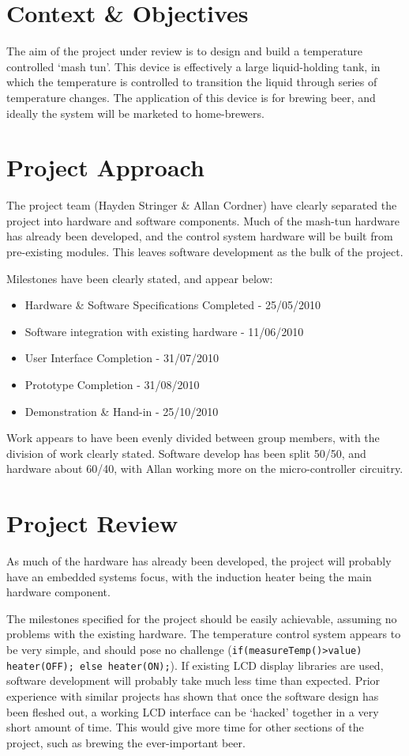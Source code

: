\documentclass[a4paper,12pt]{article}
\begin{document}
\newpage

\section{Context \& Objectives}
The aim of the project under review is to design and build a temperature controlled `mash tun'. This device is effectively a large liquid-holding tank, in which the temperature is controlled to transition the liquid through series of temperature changes.  The application of this device is for brewing beer, and ideally the system will be marketed to home-brewers. 

\section{Project Approach}
The project team (Hayden Stringer \& Allan Cordner) have clearly separated the project into hardware and software components. Much of the mash-tun hardware has already been developed, and the control system hardware will be built from pre-existing modules. This leaves software development as the bulk of the project. 

Milestones have been clearly stated, and appear below:

\begin{itemize}
\item Hardware \& Software Specifications Completed - 25/05/2010
\item Software integration with existing hardware - 11/06/2010
\item User Interface Completion - 31/07/2010
\item Prototype Completion - 31/08/2010
\item Demonstration \& Hand-in - 25/10/2010
\end{itemize}

Work appears to have been evenly divided between group members, with the division of work clearly stated. Software develop has been split 50/50, and hardware about 60/40, with Allan working more on the micro-controller circuitry.

\section{Project Review}
As much of the hardware has already been developed, the project will probably have an embedded systems focus, with the induction heater being the main hardware component.  

The milestones specified for the project should be easily achievable, assuming no problems with the existing hardware. The temperature control system appears to be very simple, and should pose no challenge (\texttt{if(measureTemp()>value) heater(OFF); else heater(ON);}).
If existing LCD display libraries are used, software development will probably take much less time than expected. Prior experience with similar projects has shown that once the software design has been fleshed out, a working LCD interface can be `hacked' together in a very short amount of time. This would give more time for other sections of the project, such as brewing the ever-important beer.
\end{document}
